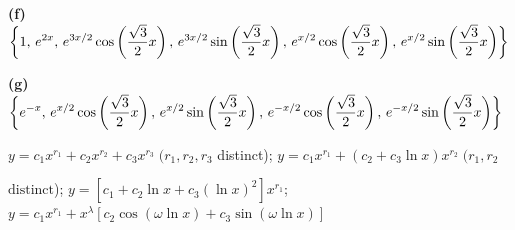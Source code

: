 \qquad
{\bf (f)}
$\displaystyle\left\{1,\,e^{2x}
,\,e^{3x/2}\cos\left(\frac{\sqrt{3}}{2}x\right),
\,e^{3x/2}\sin\left(\frac{\sqrt{3}}{2}x\right),
\,e^{x/2}\cos\left(\frac{\sqrt{3}}{2}x\right),
\,e^{x/2}\sin\left(\frac{\sqrt{3}}{2}x\right)\right\}$

\qquad
{\bf (g)}
$\displaystyle\left\{e^{-x}
,\,e^{x/2}\cos\left(\frac{\sqrt{3}}{2}x\right),
\,e^{x/2}\sin\left(\frac{\sqrt{3}}{2}x\right),
\,e^{-x/2}\cos\left(\frac{\sqrt{3}}{2}x\right),
\,e^{-x/2}\sin\left(\frac{\sqrt{3}}{2}x\right)\right\}$

 $y=c_{1}x^{r_{1}}+c_{2}x^{r_{2}}+c_{3}x^{r_{3}}\;(r_{1},r_{2},r_{3}$
distinct);   $y=c_{1}x^{r_{1}}+(c_{2}+c_{3}\ln x)x^{r_{2}}\;(r_{1},r_{2} $

$\mbox{distinct}$);\;  $y=[c_{1}+c_{2}\ln x+c_{3}(\ln x)^{2}]x^{r_{1}}$;
\; $y=c_{1}x^{r_{1}}+x^{\lambda}[c_{2}\cos(\omega\ln  x)+c_{3}\sin
(\omega\ln x)]$

